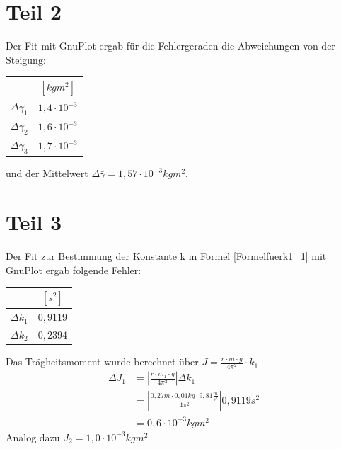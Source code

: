 \documentclass[12pt,a4paper,]{scrreprt}
\begin{document}
        \section{Teil 2}
        	Der Fit mit GnuPlot ergab für die Fehlergeraden die Abweichungen von der Steigung: \\
            \begin{center}
            
            
            \begin{tabular}{c|c}
             & $[kgm^2]$ \\ \hline
             $\Delta\gamma_1$ & $1,4 \cdot 10^{-3}$ \\
             $\Delta\gamma_2$ & $1,6 \cdot 10^{-3}$\\
             $\Delta\gamma_3$ & $1,7 \cdot 10^{-3}$
            \end{tabular} 
            \end{center}
            und der Mittelwert $\Delta\bar{\gamma} = 1,57 \cdot 10^{-3} kgm^2$.
            
       \section{Teil 3}
       		Der Fit zur Bestimmung der Konstante k in Formel \ref{Formelfuerk1_1} mit GnuPlot ergab folgende Fehler:
       		\begin{center}
       		
       		\begin{tabular}{c|c}
             		&	$[s^2]$\\ \hline
       			$\Delta k_1$ & $0,9119$ \\
                $\Delta k_2$ & $0,2394$
       		\end{tabular}
            
       		\end{center}
            Das Trägheitsmoment wurde berechnet über
           $ J  = \frac{r\cdot m \cdot g}{4\pi^2} \cdot k_1 $
           \begin{align*}
           		\Delta J_1 & = |\frac{r\cdot m_1 \cdot g}{4\pi^2}| \Delta k_1\\
                & = |\frac{0,27 m\cdot 0,01 kg \cdot 9,81 \frac{m}{s^2}}{4\pi^2}| 0,9119 s^2 \\
                & = 0,6 \cdot 10^{-3} kgm^2
           \end{align*}
           		Analog dazu $J_2 = 1,0 \cdot 10^{-3}kgm^2$
	\pagebreak
\end{document}
